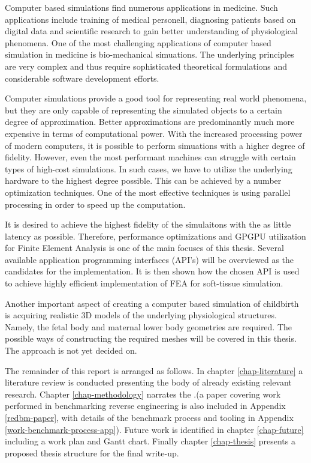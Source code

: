Computer based simulations find numerous applications in medicine. Such applications include training of medical personell, diagnosing patients based on digital data and scientific research to gain better understanding of physiological phenomena. One of the most challenging applications of computer based simulation in medicine is bio-mechanical simuations. The underlying principles are very complex and thus require sophisticated theoretical formulations and considerable software development efforts.


Computer simulations provide a good tool for representing real world phenomena, but they are only capable of representing the simulated objects to a certain degree of approximation. Better approximations are predominantly much more expensive in terms of computational power. With the increased processing power of modern computers, it is possible to perform simuations with a higher degree of fidelity. However, even the most performant machines can struggle with certain types of high-cost simulations. In such cases, we have to utilize the underlying hardware to the highest degree possible. This can be achieved by a number optimization techniques. One of the most effective techniques is using parallel processing in order to speed up the computation.

It is desired to achieve the highest fidelity of the simulaitons with the as little latency as possible. Therefore, performance optimizations and GPGPU utilization for Finite Element Analysis is one of the main focuses of this thesis. Several available application programming interfaces (API's) will be overviewed as the candidates for the implementation. It is then shown how the chosen API is used to achieve highly efficient implementation of FEA for soft-tissue simulation.

Another important aspect of creating a computer based simulation of childbirth is acquiring realistic 3D models of the underlying physiological structures. Namely, the fetal body and maternal lower body geometries are required. The possible ways of constructing the required meshes will be covered in this thesis. The approach is not yet decided on.

The remainder of this report is arranged as follows. In chapter \ref{chap-literature} a literature review is conducted  presenting the body of already existing relevant research. Chapter \ref{chap-methodology} narrates the 
.(a paper covering work performed in benchmarking reverse engineering is also included in Appendix \ref{redbm-paper}, with details of the benchmark process and tooling in Appendix \ref{work-benchmark-process-app}). Future work is identified in chapter \ref{chap-future} including a work plan and Gantt chart. Finally chapter \ref{chap-thesis} presents a proposed thesis structure for the final write-up.